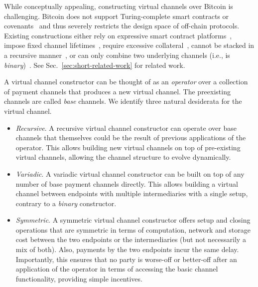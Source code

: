 \begin{table}[h!]
  \caption{PCNs vs Virtual Payment Channels}
  \label{table:pcn-vs-virtual}
\end{table}

While conceptually appealing, constructing virtual channels over Bitcoin is
challenging. Bitcoin does not support Turing-complete smart contracts or
covenants~\cite{10.1007/978-3-319-70278-0_12} and thus severely restricts the
design space of off-chain protocols. Existing constructions either rely on
expressive smart contract platforms~\cite{perun,DBLP:conf/ccs/DziembowskiFH18},
impose fixed channel lifetimes~\cite{10.1007/978-3-030-65411-5_18}, require
excessive collateral~\cite{donner}, cannot be stacked in a recursive
manner~\cite{donner}, or can only combine two underlying
channels (i.e., is \emph{binary})~\cite{9519487}. See
Sec.~\ref{sec:short-related-work} for related work.

A virtual channel constructor can be thought of as an \emph{operator} over a
collection of payment channels that produces a new virtual channel. The
preexisting channels are called \emph{base} channels.
We identify three natural desiderata for the virtual channel.

\begin{itemize}
\item \emph{Recursive}. A recursive virtual channel constructor can operate over
base channels that themselves could be the result of previous applications of the
operator. This allows building
new virtual channels on top of pre-existing virtual channels, allowing the channel
structure to evolve dynamically.
\item \emph{Variadic}. A variadic virtual channel constructor can be built on
top of any number of base payment channels directly. This allows building a
virtual channel between endpoints with multiple intermediaries with a single
setup, contrary to a \emph{binary} constructor.
\item \emph{Symmetric}. A symmetric virtual channel constructor offers setup and
closing operations that are symmetric in terms of computation, network and storage cost between the two
endpoints or the intermediaries (but not necessarily a mix of both). Also, payments by the two
endpoints incur the same delay. Importantly, this ensures that no
party is worse-off or better-off after an application of the operator in terms
of accessing the basic channel functionality, providing simple incentives.
\end{itemize}

